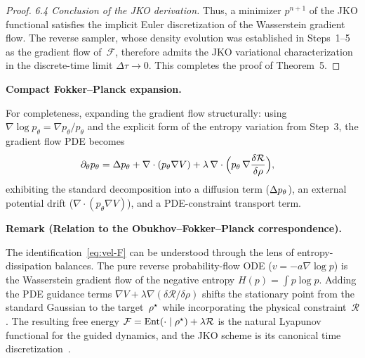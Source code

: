 \begin{proof}
\smallskip
\noindent\textit{6.4  Conclusion of the JKO derivation.}
Thus, a minimizer $p^{n+1}$ of the JKO functional satisfies the implicit Euler discretization
of the Wasserstein gradient flow.
The reverse sampler, whose density evolution was established in Steps~1--5 as the gradient
flow of~$\mathcal{F}$, therefore admits the JKO variational characterization in the
discrete-time limit $\Delta\tau \to 0$.
This completes the proof of Theorem~5.
\end{proof}

\medskip
\noindent\textbf{Compact Fokker--Planck expansion.}

For completeness, expanding the gradient flow structurally: using
$\nabla\log p_{\theta} = \nabla p_{\theta}/p_{\theta}$ and the explicit form of the
entropy variation from Step~3, the gradient flow PDE becomes
\begin{equation}
\begin{aligned}
\partial_{\theta} p_{\theta}
  &= \Delta p_{\theta}
     + \nabla\cdot(p_{\theta}\nabla V)
     + \lambda\,\nabla\cdot\Bigl( p_{\theta}\,\nabla\frac{\delta\mathcal{R}}{\delta\rho} \Bigr),
\end{aligned}
\end{equation}
exhibiting the standard decomposition into a diffusion term ($\Delta p_{\theta}$),
an external potential drift ($\nabla\cdot(p_{\theta}\nabla V)$),
and a PDE-constraint transport term.

\medskip
\noindent\textbf{Remark (Relation to the Obukhov--Fokker--Planck correspondence).}

The identification~\eqref{eq:vel-F} can be understood through the lens of
entropy-dissipation balances.
The pure reverse probability-flow ODE ($v = -a\nabla\log p$) is the Wasserstein gradient flow
of the negative entropy $H(p) = \int p\log p$.
Adding the PDE guidance terms $\nabla V + \lambda\nabla(\delta\mathcal{R}/\delta\rho)$ shifts
the stationary point from the standard Gaussian to the target~$\rho^{\star}$ while incorporating
the physical constraint~$\mathcal{R}$.
The resulting free energy $\mathcal{F} = \mathrm{Ent}(\cdot\mid\rho^{\star}) + \lambda\mathcal{R}$ is
the natural Lyapunov functional for the guided dynamics, and the JKO scheme is its canonical
time discretization~\citep{jko1998}.
